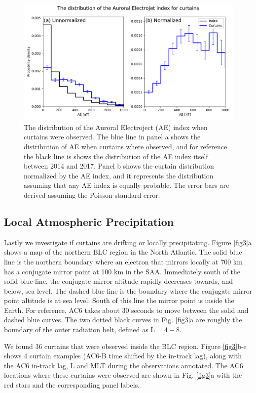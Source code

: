 \documentclass[draft]{agujournal2019}
\begin{document}
\begin{figure}
\includegraphics[width=\textwidth]{ac6_curtain_AE_dist.pdf}
\caption{The distribution of the Auroral Electroject (AE) index when curtains were observed. The blue line in panel a shows the distribution of AE when curtains where observed, and for reference the black line is shows the distribution of the AE index itself between 2014 and 2017. Panel b shows the curtain distribution normalized by the AE index, and it represents the distribution assuming that any AE index is equally probable. The error bars are derived assuming the Poisson standard error.}
\label{ae_dist}
\end{figure}

\subsection{Local Atmospheric Precipitation}
Lastly we investigate if curtains are drifting or locally precipitating. Figure \ref{fig3}a shows a map of the northern BLC region in the North Atlantic. The solid blue line is the northern boundary where an electron that mirrors locally at 700 km has a conjugate mirror point at 100 km in the SAA. Immediately south of the solid blue line, the conjugate mirror altitude rapidly decreases towards, and below, sea level. The dashed blue line is the boundary where the conjugate mirror point altitude is at sea level. South of this line the mirror point is inside the Earth. For reference, AC6 takes about 30 seconds to move between the solid and dashed blue curves. The two dotted black curves in Fig. \ref{fig3}a are roughly the boundary of the outer radiation belt, defined as $\mathrm{L}=4-8$.

We found 36 curtains that were observed inside the BLC region. Figure \ref{fig3}b-e shows 4 curtain examples (AC6-B time shifted by the in-track lag), along with the AC6 in-track lag, L and MLT during the observations annotated. The AC6 locations where these curtains were observed are shown in Fig. \ref{fig3}a with the red stars and the corresponding panel labels.
\end{document}
